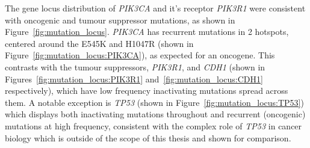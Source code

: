 The gene locus distribution of \textit{PIK3CA} and it's receptor \textit{PIK3R1} were consistent with oncogenic and \gls{tumour suppressor} \glspl{mutation}, as shown in Figure~\ref{fig:mutation_locus}. \textit{PIK3CA} has \glspl{recurrent mutation} in 2 hotspots, centered around the E545K and H1047R (shown in Figure~\ref{fig:mutation_locus:PIK3CA}), as expected for an \gls{oncogene}. This contrasts with the \glspl{tumour suppressor}, \textit{PIK3R1}, and \textit{CDH1} (shown in Figures~\ref{fig:mutation_locus:PIK3R1} and~\ref{fig:mutation_locus:CDH1} respectively), which have low frequency inactivating \glspl{mutation} spread across them. A notable exception is \textit{TP53} (shown in Figure~\ref{fig:mutation_locus:TP53}) which displays both inactivating \glspl{mutation} throughout and recurrent (oncogenic) \glspl{mutation} at high frequency, consistent with the complex role of \textit{TP53} in cancer biology which is outside of the scope of this thesis and shown for comparison. 


